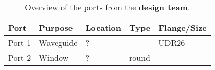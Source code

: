 \begin{table}[H]
    \centering
    \caption{Overview of the ports from the \textbf{design team}.}
    \begin{tabular}{>{\raggedright\arraybackslash}p{2cm} >{\raggedright\arraybackslash}p{3cm} >{\raggedright\arraybackslash}p{3.5cm} >{\raggedright\arraybackslash}p{3.5cm} >{\raggedright\arraybackslash}p{2cm}}
        \toprule
        \textbf{Port} & \textbf{Purpose} & \textbf{Location} & \textbf{Type} & \textbf{Flange/Size} \\
        \midrule
        Port 1        & Waveguide        & ?                 &               & UDR26                \\
        Port 2        & Window           & ?                 & round         &                      \\
        \bottomrule
    \end{tabular}
\end{table}

